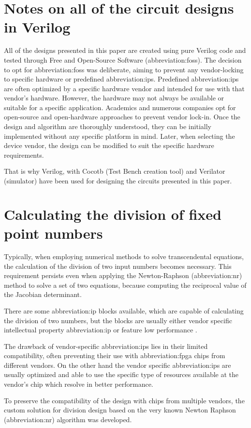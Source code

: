 \documentclass[a4paper, twoside, 11pt]{article}
\begin{document}
\flushbottom %
\newpage

\section{Notes on all of the circuit designs in Verilog}
    All of the designs presented in this paper are created using pure Verilog code and tested through Free and Open-Source Software (\gls{abbreviation:foss}). The decision to opt for \gls{abbreviation:foss}  was deliberate, aiming to prevent any vendor-locking to specific hardware or predefined \gls{abbreviation:ip}s. Predefined \gls{abbreviation:ip}s  are often optimized by a specific hardware vendor and intended for use with that vendor's hardware. However, the hardware may not always be available or suitable for a specific application. Academics and numerous companies opt for open-source and open-hardware approaches to prevent vendor lock-in. Once the design and algorithm are thoroughly understood, they can be initially implemented without any specific platform in mind. Later, when selecting the device vendor, the design can be modified to suit the specific hardware requirements.\par
    That is why Verilog, with Cocotb \cite{cocotb} (Test Bench creation tool) and Verilator \cite{verilator} (simulator) have been used for designing the circuits presented in this paper.\par

\section{Calculating the division of fixed point numbers}\label{sec:calculating-the-division-of-fixed-point-numbers}
Typically, when employing numerical methods to solve transcendental equations, the calculation of the division of two input numbers becomes necessary. This requirement persists even when applying the Newton-Raphson (\gls{abbreviation:nr}) method to solve a set of two equations, because computing the reciprocal value of the Jacobian determinant.\par
There are some \gls{abbreviation:ip} blocks available, which are capable of calculating the division of two numbers, but the blocks are usually either vendor specific intellectual property \gls{abbreviation:ip} \cite{amd-xilinx-vivado-divider-ip-block} or feature low performance \cite{burke-fixed-point-math-library}.\par
The drawback of vendor-specific \gls{abbreviation:ip}s lies in their limited compatibility, often preventing their use with \gls{abbreviation:fpga} chips from different vendors. On the other hand the vendor specific \gls{abbreviation:ip}s are usually optimized and able to use the specific type of resources available at the vendor's chip which resolve in better performance.\par
To preserve the compatibility of the design with chips from multiple vendors, the custom solution for division design based on the very known Newton Raphson (\gls{abbreviation:nr}) algorithm was developed. \cite{burke-fixed-point-math-library}
\end{document}
